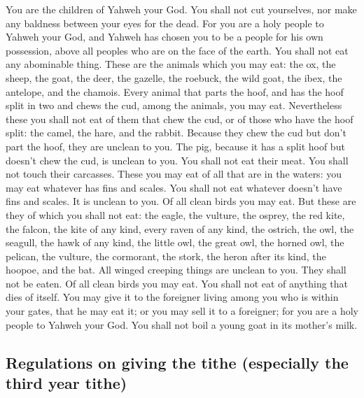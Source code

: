  You are the children of Yahweh your God. You shall not
cut yourselves, nor make any baldness between your eyes for the dead.
 For you are a holy people to Yahweh your God, and Yahweh
has chosen you to be a people for his own possession, above all peoples
who are on the face of the earth.  You shall not eat any
abominable thing.  These are the animals which you may
eat: the ox, the sheep, the goat,  the deer, the gazelle,
the roebuck, the wild goat, the ibex, the antelope, and the chamois.
 Every animal that parts the hoof, and has the hoof split
in two and chews the cud, among the animals, you may eat. 
Nevertheless these you shall not eat of them that chew the cud, or of
those who have the hoof split: the camel, the hare, and the rabbit.
Because they chew the cud but don't part the hoof, they are unclean to
you.  The pig, because it has a split hoof but doesn't
chew the cud, is unclean to you. You shall not eat their meat. You shall
not touch their carcasses.  These you may eat of all that
are in the waters: you may eat whatever has fins and scales.
 You shall not eat whatever doesn't have fins and scales.
It is unclean to you.  Of all clean birds you may eat.
 But these are they of which you shall not eat: the
eagle, the vulture, the osprey,  the red kite, the
falcon, the kite of any kind,  every raven of any kind,
 the ostrich, the owl, the seagull, the hawk of any kind,
 the little owl, the great owl, the horned owl,
 the pelican, the vulture, the cormorant, 
the stork, the heron after its kind, the hoopoe, and the bat.
 All winged creeping things are unclean to you. They
shall not be eaten.  Of all clean birds you may eat.
 You shall not eat of anything that dies of itself. You
may give it to the foreigner living among you who is within your gates,
that he may eat it; or you may sell it to a foreigner; for you are a
holy people to Yahweh your God. You shall not boil a young goat in its
mother's milk.

\hypertarget{regulations-on-giving-the-tithe-especially-the-third-year-tithe}{%
\subsection{Regulations on giving the tithe (especially the third year
tithe)}\label{regulations-on-giving-the-tithe-especially-the-third-year-tithe}}

